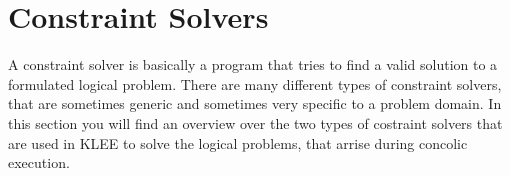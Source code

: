 \section{Constraint Solvers}
A constraint solver is basically a program that tries to find a valid solution to a formulated logical problem. 
There are many different types of constraint solvers, that are sometimes generic and sometimes very specific to a problem domain.
In this section you will find an overview over the two types of costraint solvers that are used in KLEE to solve the logical problems, that arrise during concolic execution.

